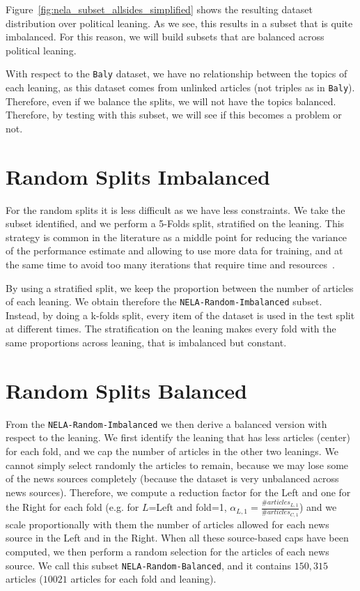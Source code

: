 Figure~\ref{fig:nela_subset_allsides_simplified} shows the resulting dataset distribution over political leaning. As we see, this results in a subset that is quite imbalanced. For this reason, we will build subsets that are balanced across political leaning.

With respect to the \texttt{Baly} dataset, we have no relationship between the topics of each leaning, as this dataset comes from unlinked articles (not triples as in \texttt{Baly}). Therefore, even if we balance the splits, we will not have the topics balanced.
Therefore, by testing with this subset, we will see if this becomes a problem or not.

\section{Random Splits Imbalanced}

For the random splits it is less difficult as we have less constraints.
We take the subset identified, and we perform a 5-Folds split, stratified on the leaning.
This strategy is common in the literature as a middle point for reducing the variance of the performance estimate and allowing to use more data for training, and at the same time to avoid too many iterations that require time and resources~\citep{fushiki2011estimation}.

By using a stratified split, we keep the proportion between the number of articles of each leaning. We obtain therefore the \texttt{NELA-Random-Imbalanced} subset.
Instead, by doing a k-folds split, every item of the dataset is used in the test split at different times.
The stratification on the leaning makes every fold with the same proportions across leaning, that is imbalanced but constant.

\section{Random Splits Balanced}

From the \texttt{NELA-Random-Imbalanced} we then derive a balanced version with respect to the leaning. We first identify the leaning that has less articles (center) for each fold, and we cap the number of articles in the other two leanings.
We cannot simply select randomly the articles to remain, because we may lose some of the news sources completely (because the dataset is very unbalanced across news sources).
Therefore, we compute a reduction factor for the Left and one for the Right for each fold (e.g. for $L$=Left and fold=1, $\alpha_{L,1} = \frac{\#articles_{L,1}}{\#articles_{C,1}}$) and we scale proportionally with them the number of articles allowed for each news source in the Left and in the Right. When all these source-based caps have been computed, we then perform a random selection for the articles of each news source.
We call this subset \texttt{NELA-Random-Balanced}, and it contains $150,315$ articles ($10021$ articles for each fold and leaning).


